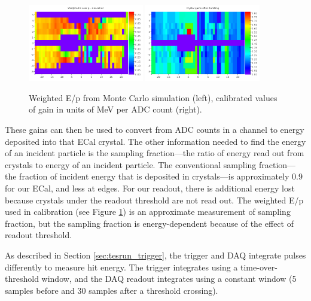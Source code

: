 \begin{figure}[ht]
	\includegraphics[width=0.45\textwidth]{test2012/ecalperformance/ecalgainplots_corr_sim}
	\includegraphics[width=0.45\textwidth]{test2012/ecalperformance/gains}
	\caption{\small{Weighted E/p from Monte Carlo simulation (left), calibrated values of gain in units of MeV per ADC count (right).}}
	\label{fig:gains}
\end{figure}

These gains can then be used to convert from ADC counts in a channel to energy deposited into that ECal crystal.
The other information needed to find the energy of an incident particle is the sampling fraction---the ratio of energy read out from crystals to energy of an incident particle.
The conventional sampling fraction---the fraction of incident energy that is deposited in crystals---is approximately 0.9 for our ECal, and less at edges.
For our readout, there is additional energy lost because crystals under the readout threshold are not read out.
The weighted E/p used in calibration (see Figure \ref{fig:gains}) is an approximate measurement of sampling fraction, but the sampling fraction is energy-dependent because of the effect of readout threshold.

\vspace{1cm}{\bf Trigger performance [Sho/Ben]}


As described in Section \ref{sec:tesrun_trigger}, the trigger and DAQ integrate pulses differently to measure hit energy. The trigger integrates using a time-over-threshold window, and the DAQ readout integrates using a constant window (5 samples before and 30 samples after a threshold crossing). 

